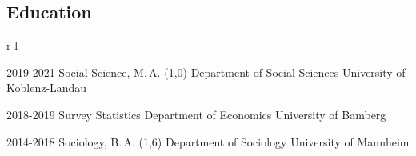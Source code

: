 \documentclass[10pt]{FreemanCV}
\begin{document}
\begin{paracol}{2}

\section{Education} 




\begin{supertabular}{r l} 


	\qualificationentry
		{2019-2021}
		{Social Science, M.\,A. \textsc{(1,0)}}
		{} 
		{Department of Social Sciences}
		{University of Koblenz-Landau}

	\qualificationentry
		{2018-2019}
		{Survey Statistics}
		{} 
		{Department of Economics} 
		{University of Bamberg}

	\qualificationentry
		{2014-2018}
		{Sociology, B.\,A. \textsc{(1,6)}}
		{} 
		{Department of Sociology}
		{University of Mannheim}


\end{supertabular}




	

\end{paracol}
\end{document}
